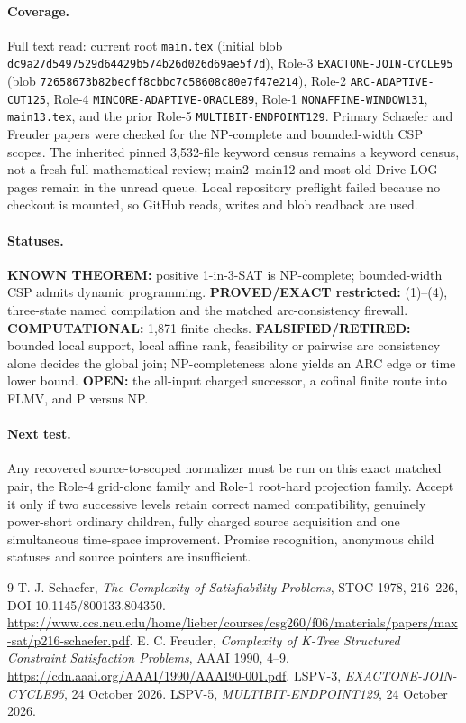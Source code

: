 \documentclass[11pt]{article}
\begin{document}
\paragraph{Coverage.}
Full text read: current root \texttt{main.tex} (initial blob
\texttt{dc9a27d5497529d64429b574b26d026d69ae5f7d}), Role-3
\texttt{EXACTONE-JOIN-CYCLE95} (blob
\texttt{72658673b82becff8cbbc7c58608c80e7f47e214}), Role-2
\texttt{ARC-ADAPTIVE-CUT125}, Role-4 \texttt{MINCORE-ADAPTIVE-ORACLE89},
Role-1 \texttt{NONAFFINE-WINDOW131}, \texttt{main13.tex}, and the prior
Role-5 \texttt{MULTIBIT-ENDPOINT129}.  Primary Schaefer and Freuder papers
were checked for the NP-complete and bounded-width CSP scopes.  The inherited
pinned 3,532-file keyword census remains a keyword census, not a fresh full
mathematical review; main2--main12 and most old Drive LOG pages remain in the
unread queue.  Local repository preflight failed because no checkout is
mounted, so GitHub reads, writes and blob readback are used.

\paragraph{Statuses.}
\textbf{KNOWN THEOREM:} positive 1-in-3-SAT is NP-complete; bounded-width CSP
admits dynamic programming.  \textbf{PROVED/EXACT restricted:} (1)--(4),
three-state named compilation and the matched arc-consistency firewall.
\textbf{COMPUTATIONAL:} 1,871 finite checks.  \textbf{FALSIFIED/RETIRED:}
bounded local support, local affine rank, feasibility or pairwise arc
consistency alone decides the global join; NP-completeness alone yields an
ARC edge or time lower bound.  \textbf{OPEN:} the all-input charged successor,
a cofinal finite route into FLMV, and P versus NP.

\paragraph{Next test.}
Any recovered source-to-scoped normalizer must be run on this exact matched
pair, the Role-4 grid-clone family and Role-1 root-hard projection family.
Accept it only if two successive levels retain correct named compatibility,
genuinely power-short ordinary children, fully charged source acquisition and
one simultaneous time-space improvement.  Promise recognition, anonymous
child statuses and source pointers are insufficient.

\begin{thebibliography}{9}
 T. J. Schaefer,
\emph{The Complexity of Satisfiability Problems}, STOC 1978, 216--226,
DOI 10.1145/800133.804350.
\url{https://www.ccs.neu.edu/home/lieber/courses/csg260/f06/materials/papers/max-sat/p216-schaefer.pdf}.
 E. C. Freuder,
\emph{Complexity of K-Tree Structured Constraint Satisfaction Problems},
AAAI 1990, 4--9.
\url{https://cdn.aaai.org/AAAI/1990/AAAI90-001.pdf}.
 LSPV-3, \emph{EXACTONE-JOIN-CYCLE95}, 24 October 2026.
 LSPV-5, \emph{MULTIBIT-ENDPOINT129}, 24 October 2026.
\end{thebibliography}
\end{document}
